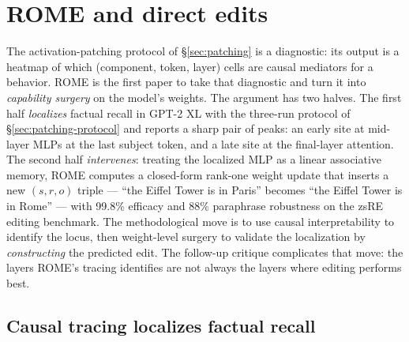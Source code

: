 
\section{ROME and direct edits}
\label{sec:rome}
\label{sec:rome-corruption-sensitivity}

The activation-patching protocol of \S\ref{sec:patching} is a diagnostic:
its output is a heatmap of which (component, token, layer) cells
are causal mediators for a behavior. ROME
\citep{meng2022-rome} is the first paper to take that diagnostic and
turn it into \emph{capability surgery} on the model's weights. The
argument has two halves. The first half \emph{localizes} factual recall
in GPT-2 XL with the three-run protocol of \S\ref{sec:patching-protocol}
and reports a sharp pair of peaks: an early site at mid-layer MLPs at
the last subject token, and a late site at the final-layer attention.
The second half \emph{intervenes}: treating the localized MLP as a
linear associative memory, ROME computes a closed-form rank-one weight
update that inserts a new $(s, r, o)$ triple --- ``the Eiffel Tower is
in Paris'' becomes ``the Eiffel Tower is in Rome'' --- with 99.8\%
efficacy and 88\% paraphrase robustness on the zsRE editing benchmark.
The methodological move is to use causal interpretability to identify
the locus, then weight-level surgery to validate the localization by
\emph{constructing} the predicted edit. The follow-up critique
\citep[Hase et al.\ 2023, ``Does Localization Inform Editing,''
forthcoming]{}  complicates that move: the layers ROME's tracing
identifies are not always the layers where editing performs best.

\subsection{Causal tracing localizes factual recall}
\label{sec:rome-tracing}

